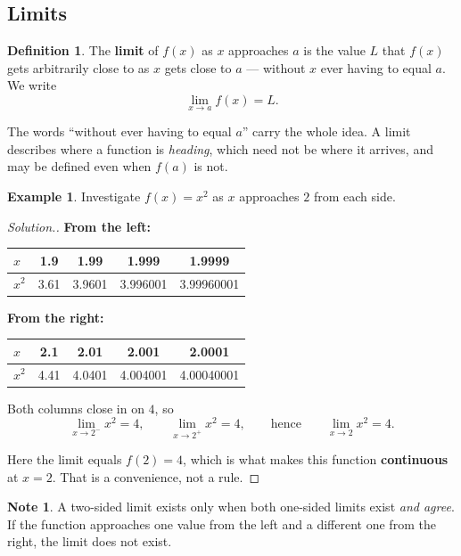 \documentclass[11pt,a4paper]{article}
\theoremstyle{definition}
\newtheorem{definition}[thm]{Definition}
\newtheorem{example}[thm]{Example}
\newtheorem{note}[thm]{Note}
\newenvironment{solution}
  {\renewcommand{\qedsymbol}{}\begin{proof}[\textit{Solution}.]}
  {\end{proof}}
\begin{document}
\subsection{Limits}

\begin{definition}
The \textbf{limit} of $f(x)$ as $x$ approaches $a$ is the value $L$ that $f(x)$ gets
arbitrarily close to as $x$ gets close to $a$ --- without $x$ ever having to equal $a$.
We write
$$\lim_{x\to a}f(x)=L.$$
\end{definition}

The words ``without ever having to equal $a$'' carry the whole idea. A limit describes
where a function is \emph{heading}, which need not be where it arrives, and may be
defined even when $f(a)$ is not.

\begin{example}
Investigate $f(x)=x^2$ as $x$ approaches $2$ from each side.
\end{example}

\begin{solution}
\textbf{From the left:}
\begin{table}[H]
\centering
\begin{tabular}{|l|c|c|c|c|}
\hline
$x$ & 1.9 & 1.99 & 1.999 & 1.9999\\
\hline
$x^2$ & 3.61 & 3.9601 & 3.996001 & 3.99960001\\
\hline
\end{tabular}
\end{table}

\textbf{From the right:}
\begin{table}[H]
\centering
\begin{tabular}{|l|c|c|c|c|}
\hline
$x$ & 2.1 & 2.01 & 2.001 & 2.0001\\
\hline
$x^2$ & 4.41 & 4.0401 & 4.004001 & 4.00040001\\
\hline
\end{tabular}
\end{table}

Both columns close in on $4$, so
$$\lim_{x\to 2^-}x^2=4,\qquad \lim_{x\to 2^+}x^2=4,\qquad\text{hence}\qquad \lim_{x\to 2}x^2=4.$$

Here the limit equals $f(2)=4$, which is what makes this function \textbf{continuous} at
$x=2$. That is a convenience, not a rule.
\end{solution}

\begin{note}
A two-sided limit exists only when both one-sided limits exist \emph{and agree}. If the
function approaches one value from the left and a different one from the right, the
limit does not exist.
\end{note}
\end{document}
